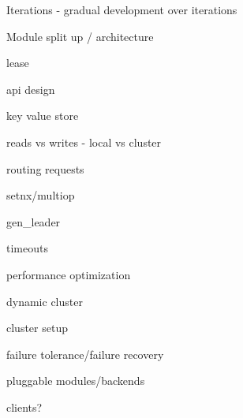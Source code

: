 Iterations - gradual development over iterations

Module split up / architecture

lease

api design

key value store

reads vs writes - local vs cluster

routing requests

setnx/multiop

gen\_leader

timeouts

performance optimization

dynamic cluster

cluster setup

failure tolerance/failure recovery

pluggable modules/backends

clients?

